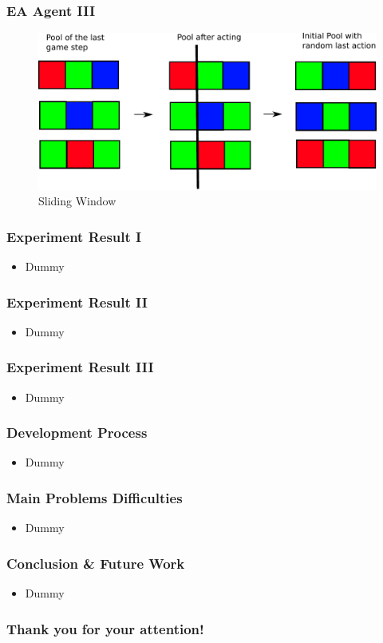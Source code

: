 \documentclass{beamer}
\begin{document}
\begin{frame}
\frametitle{EA Agent III}
\begin{figure}[H]
\centering
\includegraphics[scale=0.6]{../report/images/sliding_window.pdf}
\caption{Sliding Window}
\label{fig:sliding_window}
\end{figure}
\end{frame}


\begin{frame}
\frametitle{Experiment Result I}
\begin{itemize}
 \item Dummy
\end{itemize}
\end{frame}

\begin{frame}
\frametitle{Experiment Result II}
\begin{itemize}
 \item Dummy
\end{itemize}
\end{frame}


\begin{frame}
\frametitle{Experiment Result III}
\begin{itemize}
 \item Dummy
\end{itemize}
\end{frame}



\begin{frame}
\frametitle{Development Process}
\begin{itemize}
 \item Dummy
\end{itemize}
\end{frame}


\begin{frame}
\frametitle{Main Problems Difficulties}
\begin{itemize}
 \item Dummy
\end{itemize}
\end{frame}


\begin{frame}
\frametitle{Conclusion \& Future Work}
\begin{itemize}
 \item Dummy
\end{itemize}
\end{frame}




\begin{frame}
\begin{center}
\frametitle{Thank you for your attention!}
\end{center}
\end{frame}
\end{document}
